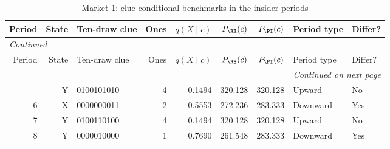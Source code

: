 \footnotesize
\begin{longtable}{rrlrrrrll}
\caption{Market 1: clue-conditional benchmarks in the insider periods}\label{tab:app-market1}\\
\toprule
Period & State & Ten-draw clue & Ones & $q(X\mid c)$ & $P_{\RE}(c)$ & $P_{\PI}(c)$ & Period type & Differ? \\
\midrule
\endfirsthead
\multicolumn{9}{l}{\textit{Continued}}\\
\toprule
Period & State & Ten-draw clue & Ones & $q(X\mid c)$ & $P_{\RE}(c)$ & $P_{\PI}(c)$ & Period type & Differ? \\
\midrule
\endhead
\midrule
\multicolumn{9}{r}{\textit{Continued on next page}}\\
\endfoot
\bottomrule
\endlastfoot
5 & Y & 0100101010 & 4 & 0.1494 & 320.128 & 320.128 & Upward & No \\
6 & X & 0000000011 & 2 & 0.5553 & 272.236 & 283.333 & Downward & Yes \\
7 & Y & 0100110100 & 4 & 0.1494 & 320.128 & 320.128 & Upward & No \\
8 & Y & 0000010000 & 1 & 0.7690 & 261.548 & 283.333 & Downward & Yes \\
\end{longtable}
